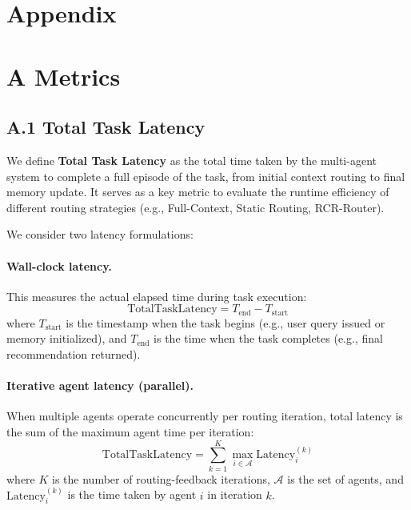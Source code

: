 \newpage
\clearpage
\onecolumn
\appendix

\section{Appendix}


\section{A \quad Metrics} \label{app:exp:metric}
\subsection{A.1 \quad Total Task Latency}

We define \textbf{Total Task Latency} as the total time taken by the multi-agent system to complete a full episode of the task, from initial context routing to final memory update. It serves as a key metric to evaluate the runtime efficiency of different routing strategies (e.g., Full-Context, Static Routing, RCR-Router).

We consider two latency formulations:

\paragraph{Wall-clock latency.} This measures the actual elapsed time during task execution:
\begin{equation}
\text{TotalTaskLatency} = T_{\text{end}} - T_{\text{start}}
\end{equation}
where $T_{\text{start}}$ is the timestamp when the task begins (e.g., user query issued or memory initialized), and $T_{\text{end}}$ is the time when the task completes (e.g., final recommendation returned).

\paragraph{Iterative agent latency (parallel).} When multiple agents operate concurrently per routing iteration, total latency is the sum of the maximum agent time per iteration:
\begin{equation}
\text{TotalTaskLatency} = \sum_{k=1}^{K} \max_{i \in \mathcal{A}} \text{Latency}_{i}^{(k)}
\end{equation}
where $K$ is the number of routing-feedback iterations, $\mathcal{A}$ is the set of agents, and $\text{Latency}_{i}^{(k)}$ is the time taken by agent $i$ in iteration $k$.

